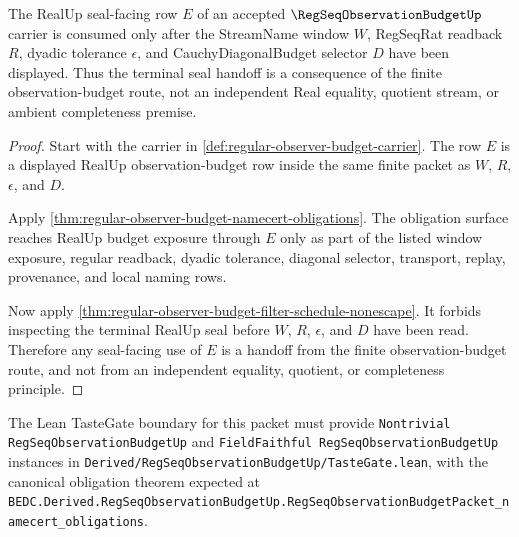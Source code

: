 \begin{theorem}\label{thm:regseq-observation-budget-real-seal-handoff}
The RealUp seal-facing row $E$ of an accepted $\RegSeqObservationBudgetUp$ carrier is consumed only after the StreamName window $W$, RegSeqRat readback $R$, dyadic tolerance $\epsilon$, and CauchyDiagonalBudget selector $D$ have been displayed. Thus the terminal seal handoff is a consequence of the finite observation-budget route, not an independent Real equality, quotient stream, or ambient completeness premise.
\end{theorem}
\begin{proof}
Start with the carrier in \autoref{def:regular-observer-budget-carrier}. The row $E$ is a displayed RealUp observation-budget row inside the same finite packet as $W$, $R$, $\epsilon$, and $D$.

Apply \autoref{thm:regular-observer-budget-namecert-obligations}. The obligation surface reaches RealUp budget exposure through $E$ only as part of the listed window exposure, regular readback, dyadic tolerance, diagonal selector, transport, replay, provenance, and local naming rows.

Now apply \autoref{thm:regular-observer-budget-filter-schedule-nonescape}. It forbids inspecting the terminal RealUp seal before $W$, $R$, $\epsilon$, and $D$ have been read. Therefore any seal-facing use of $E$ is a handoff from the finite observation-budget route, and not from an independent equality, quotient, or completeness principle.
\end{proof}

The Lean TasteGate boundary for this packet must provide \texttt{Nontrivial RegSeqObservationBudgetUp} and \texttt{FieldFaithful RegSeqObservationBudgetUp} instances in \texttt{Derived/RegSeqObservationBudgetUp/TasteGate.lean}, with the canonical obligation theorem expected at \texttt{BEDC.Derived.RegSeqObservationBudgetUp.RegSeqObservationBudgetPacket\_namecert\_obligations}.

